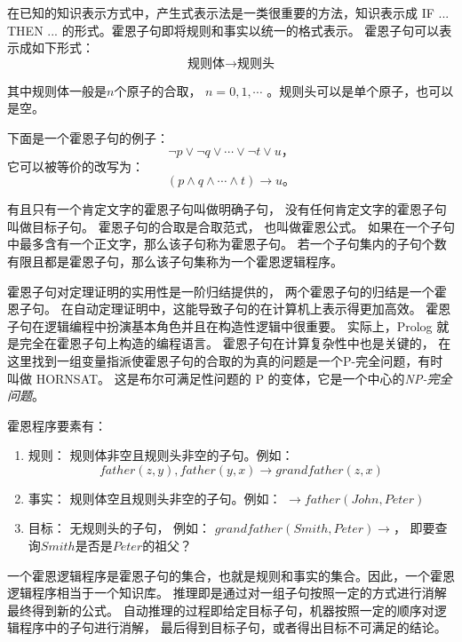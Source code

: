在已知的知识表示方式中，产生式表示法是一类很重要的方法，知识表示成
{\ttfamily IF ... THEN ... }的形式。霍恩子句即将规则和事实以统一的格式表示。
霍恩子句可以表示成如下形式：
\begin{equation*}
  \text{规则体} \rightarrow \text{规则头}
\end{equation*}

其中规则体一般是$n$个原子的合取， $n=0, 1, \cdots$ 。规则头可以是单个原子，也可以是空。

下面是一个霍恩子句的例子：
\begin{equation*}
  \lnot p \lor \lnot q \lor \cdots \lor \lnot t \lor u \text{，}
\end{equation*}
它可以被等价的改写为：
\begin{equation*}
  (p \land q \land \cdots \land t) \rightarrow u \text{。}
\end{equation*}

有且只有一个肯定文字的霍恩子句叫做明确子句， 没有任何肯定文字的霍恩子句叫做目标子句。
霍恩子句的合取是合取范式， 也叫做霍恩公式。
如果在一个子句中最多含有一个正文字，那么该子句称为霍恩子句。
若一个子句集内的子句个数有限且都是霍恩子句，那么该子句集称为一个霍恩逻辑程序。

霍恩子句对定理证明的实用性是一阶归结提供的，
两个霍恩子句的归结是一个霍恩子句。
在自动定理证明中，这能导致子句的在计算机上表示得更加高效。
霍恩子句在逻辑编程中扮演基本角色并且在构造性逻辑中很重要。
实际上，Prolog 就是完全在霍恩子句上构造的编程语言。
霍恩子句在计算复杂性中也是关键的，
在这里找到一组变量指派使霍恩子句的合取的为真的问题是一个P-完全问题，有时叫做 HORNSAT。
这是布尔可满足性问题的 P 的变体，它是一个中心的\emph{NP-完全问题}。

霍恩程序要素有：
\begin{enumerate}
  \item 规则： 规则体非空且规则头非空的子句。例如：
    \begin{equation*}
      father(z,y), father(y,x) \rightarrow grandfather(z,x)
    \end{equation*}
  \item 事实： 规则体空且规则头非空的子句。例如：
    $ \rightarrow father(John, Peter) $
  \item 目标： 无规则头的子句，
    例如： $ grandfather(Smith, Peter) \rightarrow\text{，} $
    即要查询$Smith$是否是$Peter$的祖父？
\end{enumerate}

一个霍恩逻辑程序是霍恩子句的集合，也就是规则和事实的集合。因此，一个霍恩逻辑程序相当于一个知识库。
推理即是通过对一组子句按照一定的方式进行消解最终得到新的公式。
自动推理的过程即给定目标子句，机器按照一定的顺序对逻辑程序中的子句进行消解，
最后得到目标子句，或者得出目标不可满足的结论。

